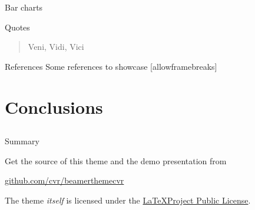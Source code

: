 \documentclass[10pt, fleqn, dvipsnames]{beamer}
\begin{document}
\begin{frame}{Bar charts}
  \begin{figure}
  \end{figure}
\end{frame}


\begin{frame}{Quotes}
  \begin{quote}
    Veni, Vidi, Vici
  \end{quote}
\end{frame}


\begin{frame}{References}
  Some references to showcase [allowframebreaks] \cite{knuth92,ConcreteMath,Simpson,Er01,greenwade93}
\end{frame}


\section{Conclusions}
\subsection{}  %


\begin{frame}{Summary}

  Get the source of this theme and the demo presentation from

  \begin{center}\url{github.com/cvr/beamerthemecvr}\end{center}

  The theme \emph{itself} is licensed under the
  \href{http://www.latex-project.org/lppl/}{\LaTeX Project Public License}.

\end{frame}
\end{document}
